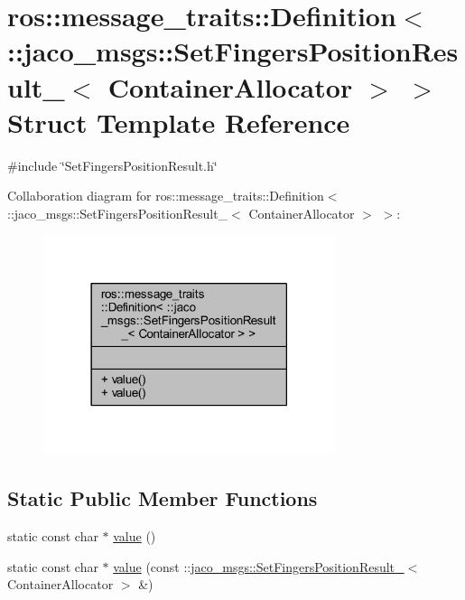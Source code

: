 \hypertarget{structros_1_1message__traits_1_1Definition_3_01_1_1jaco__msgs_1_1SetFingersPositionResult___3_01ContainerAllocator_01_4_01_4}{}\section{ros\+:\+:message\+\_\+traits\+:\+:Definition$<$ \+:\+:jaco\+\_\+msgs\+:\+:Set\+Fingers\+Position\+Result\+\_\+$<$ Container\+Allocator $>$ $>$ Struct Template Reference}
\label{structros_1_1message__traits_1_1Definition_3_01_1_1jaco__msgs_1_1SetFingersPositionResult___3_01ContainerAllocator_01_4_01_4}


{\ttfamily \#include \char`\"{}Set\+Fingers\+Position\+Result.\+h\char`\"{}}



Collaboration diagram for ros\+:\+:message\+\_\+traits\+:\+:Definition$<$ \+:\+:jaco\+\_\+msgs\+:\+:Set\+Fingers\+Position\+Result\+\_\+$<$ Container\+Allocator $>$ $>$\+:
\nopagebreak
\begin{figure}[H]
\begin{center}
\leavevmode
\includegraphics[width=242pt]{d3/d5a/structros_1_1message__traits_1_1Definition_3_01_1_1jaco__msgs_1_1SetFingersPositionResult___3_018c5a882625f0859fa197bc9cd2af6dd3}
\end{center}
\end{figure}
\subsection*{Static Public Member Functions}
\begin{DoxyCompactItemize}
\item 
static const char $\ast$ \hyperlink{structros_1_1message__traits_1_1Definition_3_01_1_1jaco__msgs_1_1SetFingersPositionResult___3_01ContainerAllocator_01_4_01_4_a08a432f8a863ae1708f3ca2c12b96e9e}{value} ()
\item 
static const char $\ast$ \hyperlink{structros_1_1message__traits_1_1Definition_3_01_1_1jaco__msgs_1_1SetFingersPositionResult___3_01ContainerAllocator_01_4_01_4_a2bc615c8d32ff33df8f58566473d9c62}{value} (const \+::\hyperlink{structjaco__msgs_1_1SetFingersPositionResult__}{jaco\+\_\+msgs\+::\+Set\+Fingers\+Position\+Result\+\_\+}$<$ Container\+Allocator $>$ \&)
\end{DoxyCompactItemize}


